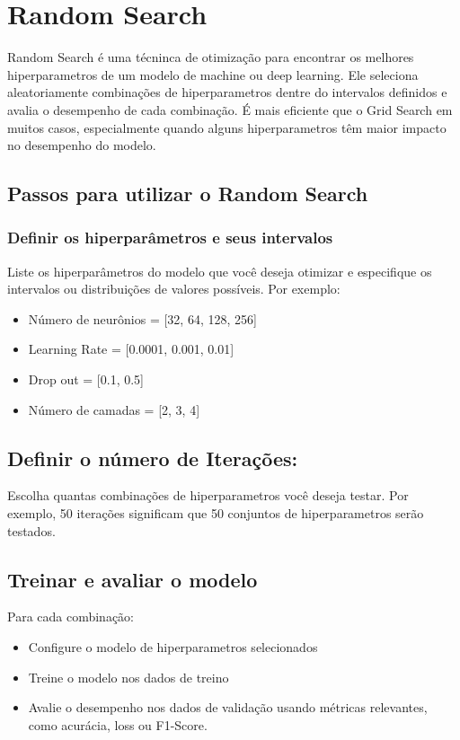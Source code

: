 \documentclass{article}
\begin{document}
\section{Random Search}
Random Search é uma técninca de otimização para encontrar os melhores hiperparametros de um modelo de machine ou deep learning. Ele seleciona aleatoriamente combinações de hiperparametros dentre do intervalos definidos e avalia o desempenho de cada combinação. É mais eficiente que o Grid Search em muitos casos, especialmente quando alguns hiperparametros têm maior impacto no desempenho do modelo.
\subsection{Passos para utilizar o Random Search}
\subsubsection{Definir os hiperparâmetros e seus intervalos}
Liste os hiperparâmetros do modelo que você deseja otimizar e especifique os intervalos ou distribuições de valores possíveis. Por exemplo: 
\begin{itemize}
    \item Número de neurônios = [32, 64, 128, 256] 
    \item Learning Rate = [0.0001, 0.001, 0.01]
    \item Drop out = [0.1, 0.5]
    \item Número de camadas = [2, 3, 4]
\end{itemize}
\subsection{Definir o número de Iterações:}
Escolha quantas combinações de hiperparametros você deseja testar. Por exemplo, 50 iterações significam que 50 conjuntos de hiperparametros serão testados.
\subsection{Treinar e avaliar o modelo}
Para cada combinação:
\begin{itemize}
    \item Configure o modelo de hiperparametros selecionados
    \item Treine o modelo nos dados de treino
    \item Avalie o desempenho nos dados de validação usando métricas relevantes, como acurácia, loss ou F1-Score.
\end{itemize}
\end{document}
